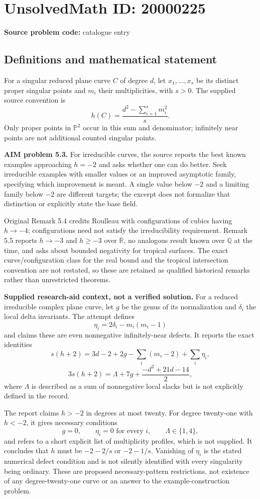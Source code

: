 \documentclass[11pt]{article}
\newcommand{\Q}{\mathbb{Q}}
\newcommand{\R}{\mathbb{R}}
\begin{document}
\section*{UnsolvedMath ID: 20000225}
\textbf{Source problem code:} catalogue entry
\subsection{Definitions and mathematical statement}
For a singular reduced plane curve $C$ of degree $d$, let $x_1,\ldots,x_s$ be its distinct proper singular points and $m_i$ their multiplicities, with $s>0$. The supplied source convention is
\[
 h(C)=\frac{d^2-\sum_{i=1}^s m_i^2}{s}.
\]
Only proper points in $\mathbb P^2$ occur in this sum and denominator; infinitely near points are not additional counted singular points.

\textbf{AIM problem 5.3.} For irreducible curves, the source reports the best known examples approaching $h=-2$ and asks whether one can do better. Seek irreducible examples with smaller values or an improved asymptotic family, specifying which improvement is meant. A single value below $-2$ and a limiting family below $-2$ are different targets; the excerpt does not formalize that distinction or explicitly state the base field.

Original Remark 5.4 credits Roulleau with configurations of cubics having $h\to-4$; configurations need not satisfy the irreducibility requirement. Remark 5.5 reports $h\to-3$ and $h\ge-3$ over $\R$, no analogous result known over $\Q$ at the time, and asks about bounded negativity for tropical surfaces. The exact curve/configuration class for the real bound and the tropical intersection convention are not restated, so these are retained as qualified historical remarks rather than unrestricted theorems.

\textbf{Supplied research-aid context, not a verified solution.} For a reduced irreducible complex plane curve, let $g$ be the genus of its normalization and $\delta_i$ the local delta invariants. The attempt defines
\[
 \eta_i=2\delta_i-m_i(m_i-1)
\]
and claims these are even nonnegative infinitely-near defects. It reports the exact identities
\[
 s(h+2)=3d-2+2g-\sum_i(m_i-2)+\sum_i\eta_i,
\]
\[
 3s(h+2)=\Lambda+7g+\frac{-d^2+21d-14}{2},
\]
where $\Lambda$ is described as a sum of nonnegative local slacks but is not explicitly defined in the record.

The report claims $h>-2$ in degrees at most twenty. For degree twenty-one with $h<-2$, it gives necessary conditions
\[
 g=0,\qquad\eta_i=0\text{ for every }i,\qquad
 \Lambda\in\{1,4\},
\]
and refers to a short explicit list of multiplicity profiles, which is not supplied. It concludes that $h$ must be $-2-2/s$ or $-2-1/s$. Vanishing of $\eta_i$ is the stated numerical defect condition and is not silently identified with every singularity being ordinary. These are proposed necessary-pattern restrictions, not existence of any degree-twenty-one curve or an answer to the example-construction problem.
\end{document}
